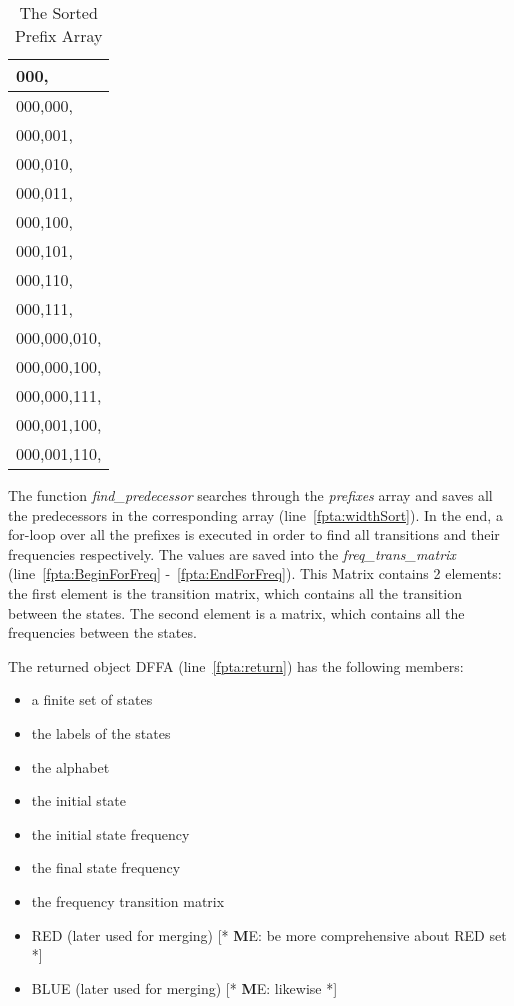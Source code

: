 \documentclass[
a4paper,
12pt
]{scrartcl}
\newcommand\me[1]{ [* {\textbf ME:} #1 *]}
\begin{document}
\begin{table}[ht!]
\centering
\begin{tabular}{|l|}
\hline
000,         \\ \hline
000,000,     \\ \hline
000,001,     \\ \hline
000,010,     \\ \hline
000,011,     \\ \hline
000,100,     \\ \hline
000,101,     \\ \hline
000,110,     \\ \hline
000,111,     \\ \hline
000,000,010, \\ \hline
000,000,100, \\ \hline
000,000,111, \\ \hline
000,001,100, \\ \hline
000,001,110, \\ \hline
\end{tabular}
\caption{The Sorted Prefix Array}
\label{table:sortPrefix}
\end{table}

The function \emph{find\_predecessor} searches through the \emph{prefixes} array and saves all the predecessors in the corresponding array (line~\ref{fpta:widthSort}). In the end, a for-loop over all the prefixes is executed in order to find all transitions and their frequencies respectively. The values are saved into the \emph{freq\_trans\_matrix}  (line~\ref{fpta:BeginForFreq} -~\ref{fpta:EndForFreq}). This Matrix contains 2 elements: the first element is the transition matrix, which contains all the transition between the states. The second element is a matrix, which contains all the frequencies between the states.

The returned object DFFA (line~\ref{fpta:return}) has the following members:
\begin{itemize}
      \item a finite set of states
      \item the labels of the states
      \item the alphabet
      \item the initial state
      \item the initial state frequency
      \item the final state frequency
      \item the frequency transition matrix
      \item RED (later used for merging) \me{be more comprehensive about RED set}
      \item BLUE (later used for merging) \me{likewise}
   \end{itemize}
\end{document}
